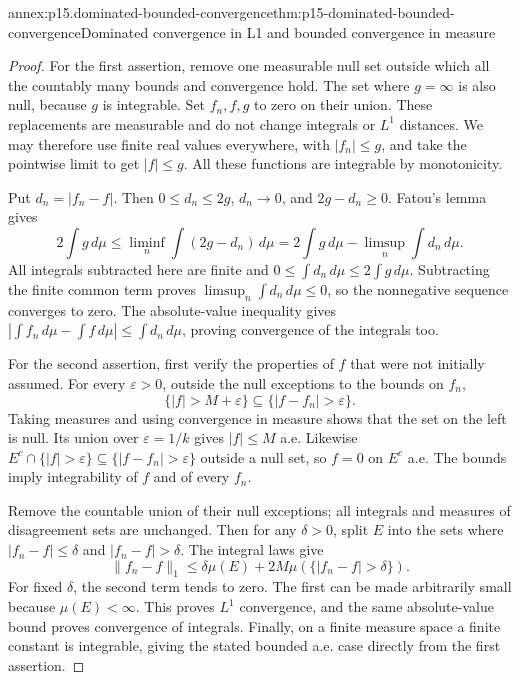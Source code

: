 \begin{annexitem}{annex:p15.dominated-bounded-convergence}{thm:p15-dominated-bounded-convergence}{Dominated convergence in L1 and bounded convergence in measure}
\begin{proof}
For the first assertion, remove one measurable null set outside which
all the countably many bounds and convergence hold. The set where
\(g=\infty\) is also null, because \(g\) is integrable. Set
\(f_n,f,g\) to zero on their union. These replacements are measurable
and do not change integrals or \(L^1\) distances. We may therefore
use finite real values everywhere, with \(|f_n|\leq g\), and
take the pointwise limit to get \(|f|\leq g\). All these functions
are integrable by monotonicity.

Put \(d_n=|f_n-f|\). Then \(0\leq d_n\leq2g\),
\(d_n\to0\), and \(2g-d_n\geq0\). Fatou's lemma gives
\[
 2\int g\,d\mu
 \leq\liminf_n\int(2g-d_n)\,d\mu
 =2\int g\,d\mu-\limsup_n\int d_n\,d\mu.
\]
All integrals subtracted here are finite and
\(0\leq\int d_n\,d\mu\leq2\int g\,d\mu\).
Subtracting the finite common term proves
\(\limsup_n\int d_n\,d\mu\leq0\), so the nonnegative sequence
converges to zero. The absolute-value inequality gives
\(\left|\int f_n\,d\mu-\int f\,d\mu\right|\leq\int d_n\,d\mu\),
proving convergence of the integrals too.

For the second assertion, first verify the properties of \(f\)
that were not initially assumed. For every \(\varepsilon>0\),
outside the null exceptions to the bounds on \(f_n\),
\[
 \{|f|>M+\varepsilon\}\subseteq\{|f-f_n|>\varepsilon\}.
\]
Taking measures and using convergence in measure shows that the set
on the left is null. Its union over \(\varepsilon=1/k\) gives
\(|f|\leq M\) a.e. Likewise
\(E^c\cap\{|f|>\varepsilon\}\subseteq\{|f-f_n|>\varepsilon\}\)
outside a null set, so \(f=0\) on \(E^c\) a.e. The bounds imply
integrability of \(f\) and of every \(f_n\).

Remove the countable union of their null exceptions; all integrals
and measures of disagreement sets are unchanged. Then for any
\(\delta>0\), split \(E\) into the sets where
\(|f_n-f|\leq\delta\) and \(|f_n-f|>\delta\). The integral
laws give
\[
 \|f_n-f\|_1\leq\delta\mu(E)
            +2M\mu(\{|f_n-f|>\delta\}).
\]
For fixed \(\delta\), the second term tends to zero. The first
can be made arbitrarily small because \(\mu(E)<\infty\).
This proves \(L^1\) convergence, and the same absolute-value bound
proves convergence of integrals. Finally, on a finite measure space a
finite constant is integrable, giving the stated bounded a.e. case
directly from the first assertion.
\end{proof}
\end{annexitem}

